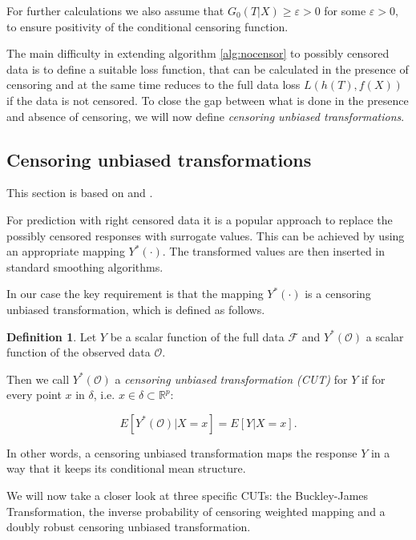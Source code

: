 \documentclass[12pt, a4paper]{scrartcl}
\theoremstyle{definition}
\newtheorem{Definition}{Definition}[section]
\theoremstyle{plain}
\numberwithin{equation}{section}
\numberwithin{figure}{section}
\numberwithin{table}{section}
\begin{document}
	 For further calculations we also assume that $G_0(T \vert X)\geq \varepsilon > 0$ for some $\varepsilon >0$, to ensure positivity of the conditional censoring function.
	
	The main difficulty in extending algorithm \ref{alg:nocensor} to possibly censored data is to define a suitable loss function, that can be calculated in the presence of censoring and at the same time reduces to the full data loss $L(h(T), f(X))$ if the data is not censored.
	To close the gap between what is done in the presence and absence of censoring, we will now define \textit{censoring unbiased transformations}.
	
	\subsection{Censoring unbiased transformations}\label{sec:drtrafo}
	This section is based on \citet*{culs} and \citet*{drcut}.
	
	
	For prediction with right censored data it is a popular approach to replace the possibly censored responses with surrogate values.
	This can be achieved by using an appropriate mapping $Y^*(\cdot)$.
	The transformed values are then inserted in standard smoothing algorithms.
	
	In our case the key requirement is that the mapping $Y^*(\cdot)$ is a censoring unbiased transformation, which is defined as follows.
	
	\begin{Definition}
	Let $Y$ be a scalar function of the full data $\mathcal{F}$ and $Y^*(\mathcal{O})$ a scalar function of the observed data $\mathcal{O}$.
	
	Then we call $Y^*(\mathcal{O})$ a \textit{censoring unbiased transformation (CUT)} for $Y$ if for every point $x$ in $\delta$, i.e. $x \in \delta \subset \mathbb{R}^p$:

	\begin{equation*}
	E[Y^*(\mathcal{O}) \vert X = x] = E[Y \vert X=x].
	\end{equation*}
	\end{Definition}

	In other words, a censoring unbiased transformation maps the response $Y$ in a way that it keeps its conditional mean structure.
	
	We will now take a closer look at three specific CUTs: the Buckley-James Transformation, the inverse probability of censoring weighted mapping and a doubly robust censoring unbiased transformation.
	
\end{document}

